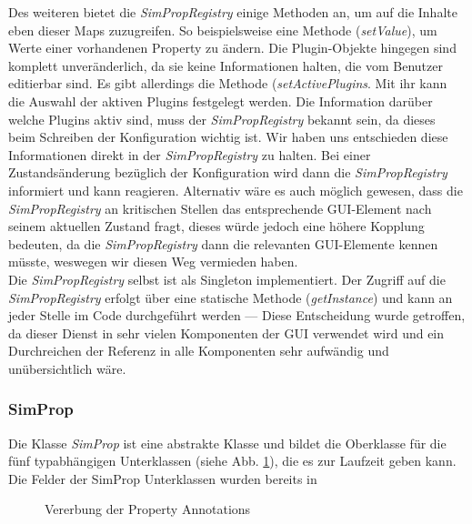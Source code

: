 \documentclass[a4paper, 11pt]{article} %
\begin{document}
Des weiteren bietet die \emph{SimPropRegistry} einige Methoden an, um auf die Inhalte eben dieser Maps zuzugreifen. So beispielsweise eine Methode (\emph{setValue}), um Werte einer vorhandenen Property zu ändern. Die Plugin-Objekte hingegen sind komplett unveränderlich, da sie keine Informationen halten, die vom Benutzer editierbar sind. Es gibt allerdings die Methode (\emph{setActivePlugins}. Mit ihr kann die Auswahl der aktiven Plugins festgelegt werden. Die Information darüber welche Plugins aktiv sind, muss der \emph{SimPropRegistry} bekannt sein, da dieses beim Schreiben der Konfiguration wichtig ist. Wir haben uns entschieden diese Informationen direkt in der \emph{SimPropRegistry} zu halten. Bei einer Zustandsänderung bezüglich der Konfiguration wird dann die \emph{SimPropRegistry} informiert und kann reagieren. Alternativ wäre es auch möglich gewesen, dass die \emph{SimPropRegistry} an kritischen Stellen das entsprechende GUI-Element nach seinem aktuellen Zustand fragt, dieses würde jedoch eine höhere Kopplung bedeuten, da die \emph{SimPropRegistry} dann die relevanten GUI-Elemente kennen müsste, weswegen wir diesen Weg vermieden haben.\\

Die \emph{SimPropRegistry} selbst ist als Singleton implementiert. Der Zugriff auf die \emph{SimPropRegistry} erfolgt über eine statische Methode (\emph{getInstance}) und kann an jeder Stelle im Code durchgeführt werden --- Diese Entscheidung wurde getroffen, da dieser Dienst in sehr vielen Komponenten der GUI verwendet wird und ein Durchreichen der Referenz in alle Komponenten sehr aufwändig und unübersichtlich wäre. 

\subsubsection{SimProp} %
\label{ssub:simprop}
Die Klasse \emph{SimProp} ist eine abstrakte Klasse und bildet die Oberklasse für die fünf typabhängigen Unterklassen (siehe Abb. \ref{fig:field_annotation}), die es zur Laufzeit geben kann. Die Felder der SimProp Unterklassen wurden bereits in  \\

\begin{figure}[!htp]
\caption{Vererbung der Property Annotations}
\label{fig:field_annotation}
\end{figure}
\end{document}
